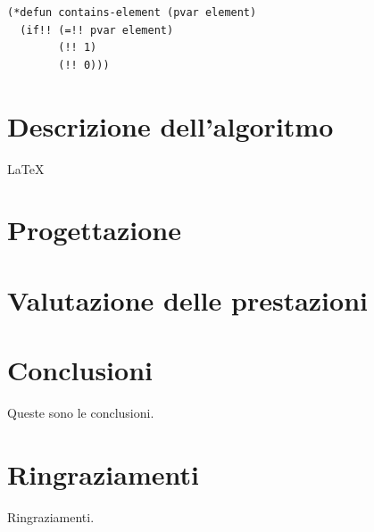 \documentclass[12pt,a4paper,openright,twoside]{report}
\begin{document}
\begin{lstlisting}[caption=Esempio di codice *Lisp. Questa versione della funzione implementa la ricerca in parallelo su tutti gli elementi dell'array.]
(*defun contains-element (pvar element)
  (if!! (=!! pvar element)
        (!! 1)
        (!! 0)))
\end{lstlisting}

\chapter{Descrizione dell'algoritmo}

\LaTeX

\chapter{Progettazione}

\chapter{Valutazione delle prestazioni}

\chapter*{Conclusioni}


Queste sono le conclusioni.\\

\clearpage{\pagestyle{empty}\cleardoublepage}





{}



\rhead[\fancyplain{}{\bfseries \leftmark}]{\fancyplain{}{\bfseries\thepage}}
\clearpage{\pagestyle{empty}\cleardoublepage}



\chapter*{Ringraziamenti}
\thispagestyle{empty}
Ringraziamenti.

\nocite{*}
\end{document}
